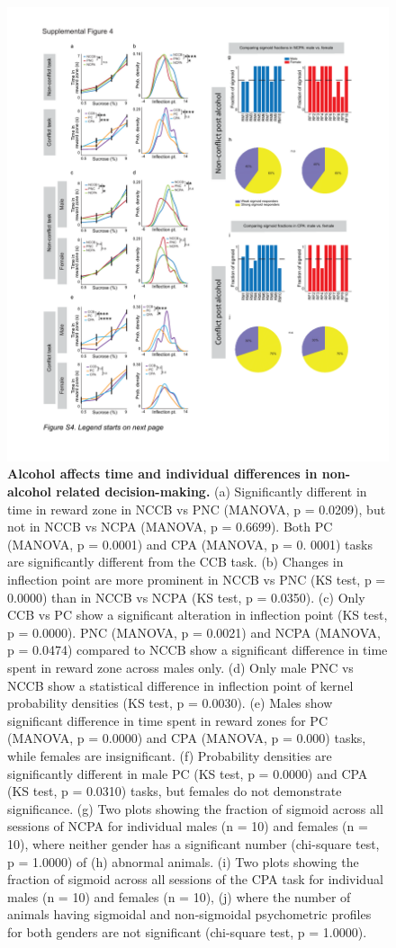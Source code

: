 \documentclass{article}
\newcounter{suppfig}
\renewcommand{\thesuppfig}{S\arabic{suppfig}}  %
\newenvironment{suppfigure}[1][htbp]
  {\refstepcounter{suppfig}%
   \begin{figure}[#1]%
   \renewcommand{\thefigure}{\thesuppfig}}%
  {\end{figure}}
\begin{document}
\begin{suppfigure}
  \centering
  \includegraphics[width=\textwidth, trim=50 100 50 100]{Figs/Alcohol_SI_4.pdf}
  \caption{\textbf{Alcohol affects time and individual differences in non-alcohol related decision-making.} (a) Significantly different in time in reward zone in NCCB vs PNC (MANOVA, p = 0.0209), but not in NCCB vs NCPA (MANOVA, p = 0.6699). Both PC (MANOVA, p = 0.0001) and CPA (MANOVA, p = 0. 0001) tasks are significantly different from the CCB task. (b) Changes in inflection point are more prominent in NCCB vs PNC (KS test, p = 0.0000) than in NCCB vs NCPA (KS test, p = 0.0350). (c) Only CCB vs PC show a significant alteration in inflection point (KS test, p = 0.0000). PNC (MANOVA, p = 0.0021) and NCPA (MANOVA, p = 0.0474) compared to NCCB show a significant difference in time spent in reward zone across males only. (d) Only male PNC vs NCCB show a statistical difference in inflection point of kernel probability densities (KS test, p = 0.0030). (e) Males show significant difference in time spent in reward zones for PC (MANOVA, p = 0.0000) and CPA (MANOVA, p = 0.000) tasks, while females are insignificant. (f) Probability densities are significantly different in male PC (KS test, p = 0.0000) and CPA (KS test, p = 0.0310) tasks, but females do not demonstrate significance. (g) Two plots showing the fraction of sigmoid across all sessions of NCPA for individual males (n = 10) and females (n = 10), where neither gender has a significant number (chi-square test, p = 1.0000) of (h) abnormal animals. (i) Two plots showing the fraction of sigmoid across all sessions of the CPA task for individual males (n = 10) and females (n = 10), (j) where the number of animals having sigmoidal and non-sigmoidal psychometric profiles for both genders are not significant (chi-square test, p = 1.0000).}

\end{suppfigure}
\end{document}
